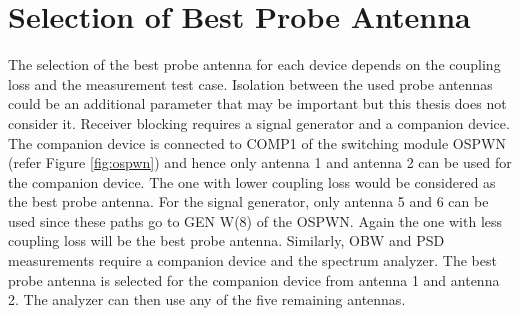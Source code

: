 \section{Selection of Best Probe Antenna} \label{sec:sba}
The selection of the best probe antenna for each device depends on the coupling loss and the measurement test case. Isolation between the used probe antennas could be an additional parameter that may be important but this thesis does not consider it. Receiver blocking requires a signal generator and a companion device. The companion device is connected to COMP1 of the switching module OSPWN (refer Figure \ref{fig:ospwn}) and hence only antenna 1 and antenna 2 can be used for the companion device. The one with lower coupling loss would be considered as the best probe antenna. For the signal generator, only antenna 5 and 6 can be used since these paths go to GEN W(8) of the OSPWN. Again the one with less coupling loss will be the best probe antenna. Similarly, \acf{OBW} and \acf{PSD} measurements require a companion device and the spectrum analyzer. The best probe antenna is selected for the companion device from antenna 1 and antenna 2. The analyzer can then use any of the five remaining antennas.




















